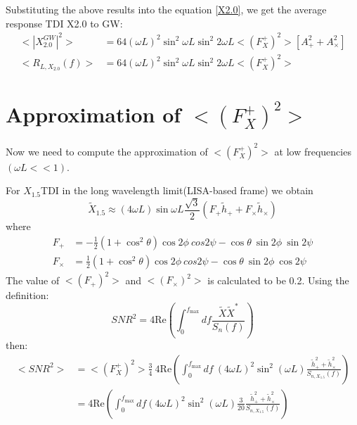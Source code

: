 \documentclass{article}
\begin{document}
	Substituting the above results into the equation \ref{X2.0}, we get the average response TDI X2.0 to GW:
	\begin{align}
		<\left|X^{GW}_{2.0}\right|^2> &= 64 (\omega L)^2 \sin^2 \omega L \sin^2 2 \omega L <(F^{+}_{X})^2> [A^2_{+} + A^2_{\times}] \\
		<R_{L,X_{2.0}} (f)> &= 64 (\omega L)^2 \sin^2 \omega L \sin^2 2 \omega L <(F^{+}_{X})^2>
	\end{align}
	
	\section{Approximation of $<(F^{+}_{X})^2>$}
	Now we need to compute the approximation of $<(F^{+}_{X})^2>$ at low frequencies $(\omega L << 1)$.
	
	For $X_{1.5}$TDI in the long wavelength limit(LISA-based frame) we obtain 
	\begin{equation}
		\tilde{X}_{1.5} \approx (4 \omega L) \sin \omega L \frac{\sqrt{3}}{2} (F_{+} \tilde{h}_{+} + F_{\times} \tilde{h}_{\times} )
	\end{equation} 
	where \begin{align}
		F_{+} &= -\frac{1}{2}(1 + \cos^2 \theta) \cos 2 \phi ~cos 2 \psi - \cos\theta ~\sin 2 \phi ~\sin 2 \psi \\
		F_{\times} &= \frac{1}{2}(1 + \cos^2 \theta) \cos 2\phi ~cos 2 \psi - \cos\theta ~\sin 2 \phi ~\cos 2 \psi
	\end{align}
	The value of $<(F_{+})^2>$ and $<(F_{\times})^2>$ is calculated to be 0.2. Using the definition:
	\begin{equation}
		SNR^2 = 4\text{Re}\left(\int_{0}^{f_{\text{max}}} df \frac{\tilde{X}\tilde{X}^*}{S_n(f)}\right)
	\end{equation}
	then:
	\begin{align}
		<SNR^2> &= <(F^{+}_{X})^2>\frac{3}{4}~ 4\text{Re} \left(\int_{0}^{f_{\text{max}}} df~(4\omega L)^2 \sin^2(\omega L) \frac{\tilde{h}^2_{+} + \tilde{h}^2_{\times}}{S_{n,X_{1.5}}(f)}\right) \\
		&= 4\text{Re} \left(\int_{0}^{f_{\text{max}}} df  (4\omega L)^2 \sin^2(\omega L) \frac{3}{20}\frac{\tilde{h}^2_{+} + \tilde{h}^2_{\times}}{S_{n,X_{1.5}}(f)}\right)
	\end{align}
	
\end{document}
